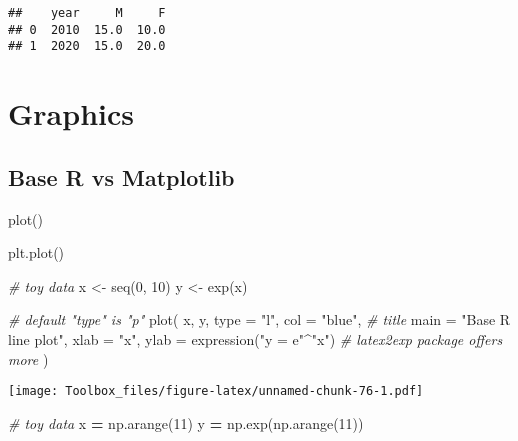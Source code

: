 \documentclass[
]{book}
\newenvironment{Shaded}{\begin{snugshade}}{\end{snugshade}}
\newcommand{\AttributeTok}[1]{\textcolor[rgb]{0.77,0.63,0.00}{#1}}
\newcommand{\CommentTok}[1]{\textcolor[rgb]{0.56,0.35,0.01}{\textit{#1}}}
\newcommand{\DecValTok}[1]{\textcolor[rgb]{0.00,0.00,0.81}{#1}}
\newcommand{\FunctionTok}[1]{\textcolor[rgb]{0.00,0.00,0.00}{#1}}
\newcommand{\NormalTok}[1]{#1}
\newcommand{\OperatorTok}[1]{\textcolor[rgb]{0.81,0.36,0.00}{\textbf{#1}}}
\newcommand{\OtherTok}[1]{\textcolor[rgb]{0.56,0.35,0.01}{#1}}
\newcommand{\SpecialCharTok}[1]{\textcolor[rgb]{0.00,0.00,0.00}{#1}}
\newcommand{\StringTok}[1]{\textcolor[rgb]{0.31,0.60,0.02}{#1}}
\begin{document}
\begin{verbatim}
##    year     M     F
## 0  2010  15.0  10.0
## 1  2020  15.0  20.0
\end{verbatim}

\hypertarget{graphics}{%
\chapter{Graphics}\label{graphics}}

\hypertarget{base-r-vs-matplotlib}{%
\section{Base R vs Matplotlib}\label{base-r-vs-matplotlib}}

plot()

plt.plot()

\begin{Shaded}
\begin{Highlighting}[]
\CommentTok{\# toy data}
\NormalTok{x }\OtherTok{\textless{}{-}} \FunctionTok{seq}\NormalTok{(}\DecValTok{0}\NormalTok{, }\DecValTok{10}\NormalTok{)}
\NormalTok{y }\OtherTok{\textless{}{-}} \FunctionTok{exp}\NormalTok{(x)}
\end{Highlighting}
\end{Shaded}

\begin{Shaded}
\begin{Highlighting}[]
\CommentTok{\# default "type" is "p"}
\FunctionTok{plot}\NormalTok{(}
\NormalTok{  x, y,}
  \AttributeTok{type =} \StringTok{"l"}\NormalTok{,}
  \AttributeTok{col =} \StringTok{"blue"}\NormalTok{,}
  \CommentTok{\# title}
  \AttributeTok{main =} \StringTok{"Base R line plot"}\NormalTok{,}
  \AttributeTok{xlab =} \StringTok{"x"}\NormalTok{,}
  \AttributeTok{ylab =} \FunctionTok{expression}\NormalTok{(}\StringTok{"y = e"}\SpecialCharTok{\^{}}\StringTok{"x"}\NormalTok{)}
  \CommentTok{\# latex2exp package offers more}
\NormalTok{)}
\end{Highlighting}
\end{Shaded}

\texttt{[image: Toolbox\_files/figure-latex/unnamed-chunk-76-1.pdf]}

\begin{Shaded}
\begin{Highlighting}[]
\CommentTok{\# toy data}
\NormalTok{x }\OperatorTok{=}\NormalTok{ np.arange(}\DecValTok{11}\NormalTok{)}
\NormalTok{y }\OperatorTok{=}\NormalTok{ np.exp(np.arange(}\DecValTok{11}\NormalTok{))}
\end{Highlighting}
\end{Shaded}
\end{document}
